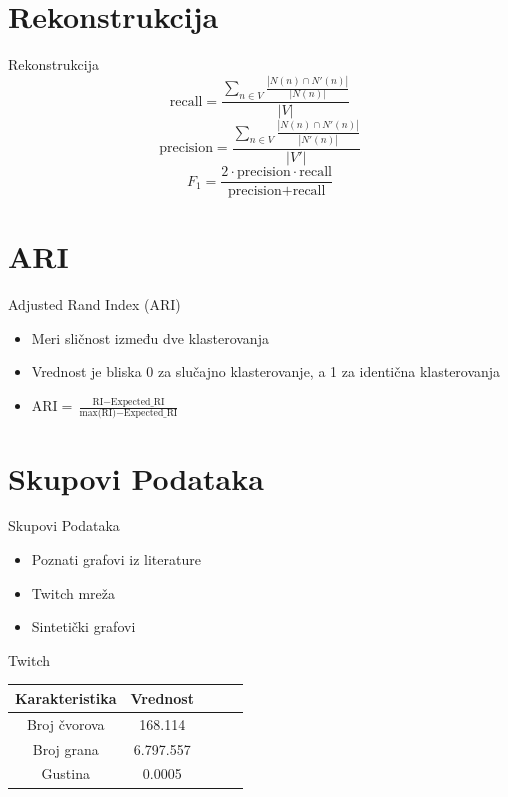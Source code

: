 \documentclass{beamer}
\begin{document}
\section{Rekonstrukcija}
\begin{frame}{Rekonstrukcija}
    $$ \text{recall} = \frac{\sum_{n \in V} \frac{|N(n) \cap N'(n)|}{|N(n)|}}{|V|} $$
    $$ \text{precision} = \frac{\sum_{n \in V} \frac{|N(n) \cap N'(n)|}{|N'(n)|}}{|V'|} $$
    $$ F_1 = \frac{2 \cdot \text{precision} \cdot \text{recall}}{\text{precision} + \text{recall}} $$
\end{frame}


\section{ARI}
\begin{frame}{Adjusted Rand Index (ARI)}
    \begin{itemize}
        \item Meri sličnost između dve klasterovanja
        \item Vrednost je bliska 0 za slučajno klasterovanje, a 1 za identična klasterovanja
        \item $ \text{ARI} = \frac{\text{RI} - \text{Expected\_RI}}{\text{max(RI)} - \text{Expected\_RI}} $
    \end{itemize}
\end{frame}

\section{Skupovi Podataka}
\begin{frame}{Skupovi Podataka}
    \begin{itemize}
        \item Poznati grafovi iz literature 
        \item Twitch mreža
        \item Sintetički grafovi 
    \end{itemize}
\end{frame}

\begin{frame}{Twitch}
    \centering
    \begin{tabular}{|c|c|c|c|c|}
        \hline
        \textbf{Karakteristika} & \textbf{Vrednost} \\
        \hline
        Broj čvorova & 168.114 \\
        Broj grana & 6.797.557 \\
        Gustina & 0.0005 \\
        \hline
    \end{tabular}
\end{frame}
\end{document}
